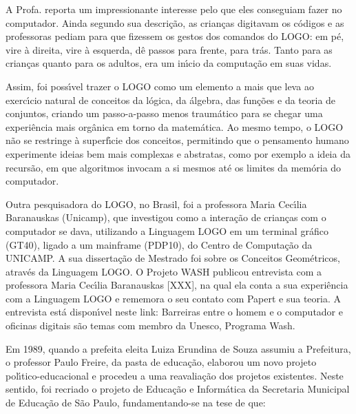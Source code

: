 \documentclass[
12pt,		%
openright,	%
twoside,  %
a4paper,			%
chapter=TITLE,		%
english,			%
french,				%
spanish,			%
brazil				%
]{USPSC-classe/USPSC_RedarTex}
\begin{document}
A Profa. reporta um impressionante interesse pelo que eles conseguiam fazer no computador. Ainda segundo sua descri\c{c}\~ao, as crian\c{c}as digitavam  os c\'odigos e as professoras pediam para que fizessem os gestos dos comandos do LOGO: \textquotedbl em p\'e\textquotedbl , \textquotedbl vire \`a direita\textquotedbl , \textquotedbl vire \`a esquerda\textquotedbl , \textquotedbl d\^e passos para frente\textquotedbl , \textquotedbl para tr\'as\textquotedbl . Tanto para as crian\c{c}as quanto para os adultos, era um in\'{\i}cio da computa\c{c}\~ao em suas vidas.








Assim, foi poss\'{\i}vel trazer o LOGO como um elemento a mais que leva ao exerc\'{\i}cio natural de conceitos da l\'ogica, da \'algebra, das fun\c{c}\~oes e da teoria de conjuntos, criando um passo-a-passo menos traum\'atico para se chegar uma experi\^encia mais org\^anica em torno da matem\'atica. Ao mesmo tempo, o LOGO n\~ao se restringe \`a superf\'{\i}cie dos conceitos, permitindo que o pensamento humano experimente ideias bem mais complexas e abstratas, como por exemplo a ideia da recurs\~ao, em que algoritmos invocam a si mesmos at\'e os limites da mem\'oria do computador.








Outra pesquisadora do LOGO, no Brasil, foi a professora Maria Cec\'{\i}lia Baranauskas (Unicamp), que investigou como a intera\c{c}\~ao de crian\c{c}as com o computador se dava, utilizando a Linguagem LOGO em um terminal gr\'afico (GT40), ligado a um mainframe (PDP10), do Centro de Computa\c{c}\~ao da UNICAMP. A sua disserta\c{c}\~ao de Mestrado foi sobre os \textquotedbl Conceitos Geom\'etricos, atrav\'es da Linguagem LOGO\textquotedbl . O Projeto WASH publicou entrevista com a professora Maria Cec\'{\i}lia Baranauskas [XXX], na qual ela conta a sua experi\^encia com a Linguagem LOGO e rememora o seu contato com Papert e sua teoria. A entrevista est\'a dispon\'{\i}vel neste link: \textquotedbl Barreiras entre o homem e o computador e oficinas digitais s\~ao temas com membro da Unesco, Programa Wash\textquotedbl .








Em 1989, quando a prefeita eleita Luiza Erundina de Souza assumiu a Prefeitura, o professor Paulo Freire, da pasta de educa\c{c}\~ao, elaborou um novo projeto pol\'{\i}tico-educacional e procedeu a uma reavalia\c{c}\~ao dos projetos existentes. Neste sentido, foi recriado o projeto de Educa\c{c}\~ao e Inform\'atica da Secretaria Municipal de Educa\c{c}\~ao de S\~ao Paulo, fundamentando-se na tese de que:
\end{document}
